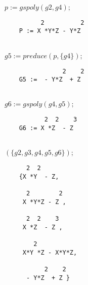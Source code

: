 \hspace*{+1cm}{\it \% next S-polynomial} \\
\hspace*{+1cm} $p :=  gspoly(g2,g4); $

\begin{verbatim}
          2          2
    P := X *Y*Z - Y*Z
 \end{verbatim}

\hspace*{+1cm}{\it \% and reducing, here only by g4, but preduce
needs a list} \\ \hspace*{+1cm} $g5  :=  preduce(p,\{g4\}); $

\begin{verbatim}
                2    2
    G5 :=  - Y*Z  + Z
\end{verbatim}

\hspace*{+1cm}{\it \% last S-polynomial} \\
\hspace*{+1cm}$ g6  :=  gspoly(g4,g5);$

\begin{verbatim}
           2  2    3
    G6 := X *Z  - Z
\end{verbatim}

\hspace*{+1cm}{\it \% and the final basis sorted descending} \\
\hspace*{+1cm}{\it gsort} $(\{g2,g3,g4,g5,g6\});$

\begin{verbatim}
      2  2
    {X *Y  - Z,

      2        2
     X *Y*Z - Z ,

      2  2    3
     X *Z  - Z ,

        2
     X*Y *Z - X*Y*Z,

           2    2
      - Y*Z  + Z }
 \end{verbatim}



